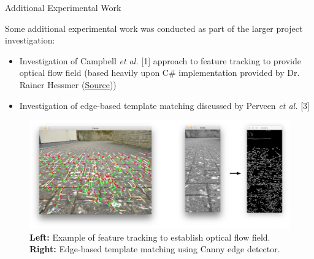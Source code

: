 \documentclass[10pt, compress]{beamer}
\begin{document}
\begin{frame}{Additional Experimental Work}

\vspace{-10pt}

{\small Some additional experimental work was conducted as part of the larger project investigation:

\begin{itemize}[label={\textbullet}]
  	\item Investigation of Campbell \textit{et al.} [1] approach to feature tracking to provide optical flow field (based heavily upon C\# implementation provided by Dr. Rainer Hessmer (\href{http://www.hessmer.org/blog/2010/08/17/monocular-visual-odometry}{Source}))
  	\item Investigation of edge-based template matching discussed by Perveen \textit{et al.} [3]
  \end{itemize} }
  
  \vspace{-10pt}
  
    		  \begin{figure}[ht!]
\centering
\includegraphics[scale=0.16]{additional_work}
 \caption{\textbf{Left:} Example of feature tracking to establish optical flow field. \textbf{Right:} Edge-based template matching using Canny edge detector.}
\end{figure}
  		

\end{frame}

\end{document}
